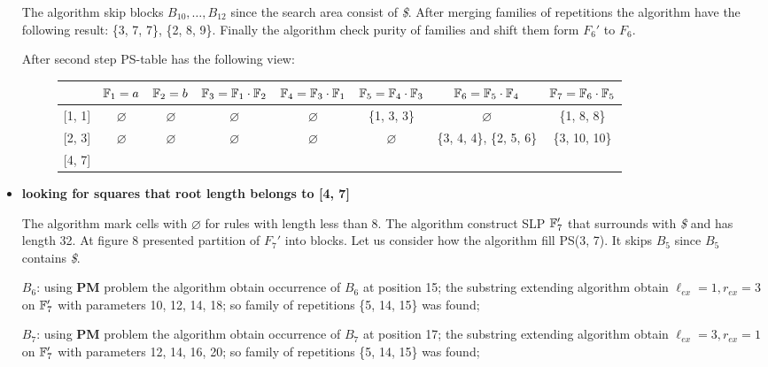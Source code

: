 ﻿\documentclass[11pt]{article}
\begin{document}
\begin{appendix}
\begin{itemize}
  The algorithm skip blocks $B_{10}, \dots, B_{12}$ since the search area consist of \emph{\$}. After merging families 
  of repetitions the algorithm have the following result: \{3, 7, 7\}, \{2, 8, 9\}. Finally the algorithm check purity
  of families and shift them form $F_{6}'$ to $F_6$. 
  
  After second step PS-table has the following view:
  
  \begin{figure}[h]
	  {\footnotesize\noindent
		\begin{tabular}{|c|c|c|c|c|c|c|c|} \hline
	 	& $\mathbb{F}_{1} = a$ & $\mathbb{F}_{2} = b$ & $\mathbb{F}_{3} = \mathbb{F}_{1} \cdot \mathbb{F}_{2}$ & $\mathbb{F}_{4} = \mathbb{F}_{3} \cdot \mathbb{F}_{1}$ &
	 	$\mathbb{F}_{5} = \mathbb{F}_{4} \cdot \mathbb{F}_{3}$ & $\mathbb{F}_{6} = \mathbb{F}_{5} \cdot \mathbb{F}_{4}$ & $\mathbb{F}_{7} = \mathbb{F}_{6} \cdot \mathbb{F}_{5}$ \\ \hline
	
	 	[1, 1] & $\varnothing$ & $\varnothing$ & $\varnothing$ & $\varnothing$ & \{1, 3, 3\} & $\varnothing$ & \{1, 8, 8\} \\
	 	\hline
	
	 	[2, 3] & $\varnothing$ & $\varnothing$ & $\varnothing$ & $\varnothing$ & $\varnothing$ & \{3, 4, 4\}, \{2, 5, 6\} &
	 	\{3, 10, 10\} \\ 	\hline
	
	 	[4, 7] & & & & & & & \\ \hline
		\end{tabular}
	  }
  \end{figure}
  
  \item \textbf{looking for squares that root length belongs to [4, 7]}
  
  The algorithm mark cells with $\varnothing$ for rules with length less than 8. The algorithm construct SLP
  $\mathbb{F}_7'$ that surrounds with \emph{\$} and has length 32. At figure 8 presented partition of $F_7'$ into
  blocks. Let us consider how the algorithm fill PS(3, 7). It skips $B_5$ since $B_5$ contains \emph{\$}. 
  
   \FibonacciWordPartitionComplex
  
  $B_6$: using \textbf{PM} problem the algorithm obtain occurrence of $B_6$ at position 15; the substring extending algorithm
  obtain $\ell_{ex} = 1, r_{ex} = 3$ on $\mathbb{F}_{7}'$ with parameters 10, 12, 14, 18; so family of repetitions \{5, 14,
  15\} was found;
  
  $B_7$: using \textbf{PM} problem the algorithm obtain occurrence of $B_7$ at position 17; the substring extending algorithm
  obtain $\ell_{ex} = 3, r_{ex} = 1$ on $\mathbb{F}_{7}'$ with parameters 12, 14, 16, 20; so family of repetitions \{5, 14,
  15\} was found;
  

\end{itemize}
\end{appendix}
\end{document}
